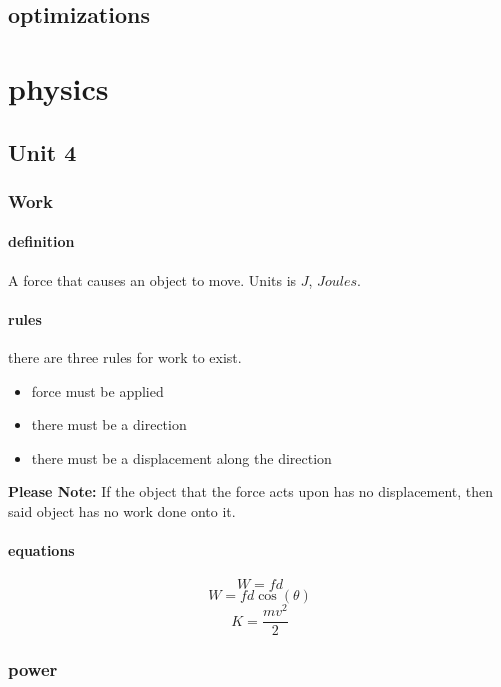 \documentclass{article} %
\theoremstyle{theorem}
\theoremstyle{definition}
\begin{document}
    \subsection{optimizations}
\section{physics}
    \subsection{Unit 4}
        \subsubsection{Work}
            \paragraph{definition}
                A force that causes an object to move. Units is $J$, $Joules$.
            \paragraph{rules}
                there are three rules for work to exist.
                \begin{itemize}
                    \item force must be applied
                    \item there must be a direction
                    \item there must be a displacement along the direction
                \end{itemize}
                \textbf{Please Note:} 
                If the object that the force acts upon has no displacement, then said object has no work done onto it.
            \paragraph{equations}
                \begin{equation} W=fd \end{equation}
                \begin{equation} W=fd\cos(\theta) \end{equation}
                \begin{equation} K=\frac{mv^2}{2} \end{equation}
        \subsubsection{power}
\end{document}
